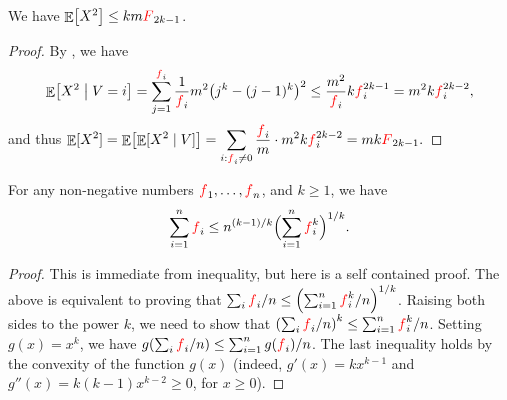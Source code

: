 
\begin{lemma}
    We have $\mathop{\mathbb{E}}\!\left[ {X^2} \right] \leq k m {\textcolor{red}{F}}_{2k-1}$.
\end{lemma}
\begin{proof}
    By , we have
    \begin{equation*}
        \ExCond{X^2}{V=i} =%
        \sum_{j=1}^{\frq_i}\frac{1}{\frq_i} m^2 \bigl( j^k - (j-1)^k
        \bigr)^2 \leq \frac{m^2}{\frq_i} k \frq_i^{2k-1}%
        =%
        m^2 k \frq_i^{2k-2},
    \end{equation*}
    and thus
    \begin{math}
        \ds%
        \Ex{\smash{X^2}}%
        =%
        \Ex{\bigl.\ExCond{\smash{X^2}}{V}\bigr.} %
        =%
        \sum_{i: \frq_i\neq 0} \frac{\frq_i}{m}\cdot m^2 k
        \frq_i^{2k-2} = mk \Frq_{2k-1}.
    \end{math}
\end{proof}


\begin{lemma}
    For any non-negative numbers ${\textcolor{red}{f}}_1, \ldots, {\textcolor{red}{f}}_n$, and
    $k \geq 1 $, we have
    \begin{equation*}
        \sum_{i=1}^n {\textcolor{red}{f}}_i \leq n^{(k-1)/k} \Bigl( \sum_{i=1}^n
        {\textcolor{red}{f}}_i^k\Bigr)^{1/k}.
    \end{equation*}
\end{lemma}
\begin{proof}
    This is immediate from \Holder inequality, but here is a self
    contained proof.  The above is equivalent to proving that
    $\sum_i {\textcolor{red}{f}}_i/n \leq \Bigl( \sum_{i=1}^n {\textcolor{red}{f}}_i^k/n \Bigr)^{1/k}
    $.  Raising both sides to the power $k$, we need to show that
    $\pth{\sum_i \frq_i/n}^k \leq \sum_{i=1}^n \frq_i^k/n$. Setting
    $g(x)=x^k$, we have
    $g \pth{\sum_i \frq_i/n} \leq \sum_{i=1}^n g(\frq_i)/n$.  The last
    inequality holds by the convexity of the function $g(x)$ (indeed,
    $g'(x) = kx^{k-1}$ and $g''(x) = k(k-1)x^{k-2} \geq 0$, for
    $x \geq 0$).
\end{proof}


